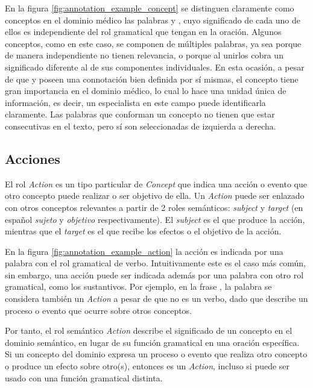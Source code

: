 \vspace{-0.8cm}
En la figura \ref{fig:annotation_example_concept} se distinguen claramente como conceptos en el dominio médico las palabras  y , cuyo significado de cada uno de ellos es independiente del rol gramatical que tengan en la oración. Algunos conceptos, como  en este caso, se componen de múltiples palabras, ya sea porque de manera independiente no tienen relevancia, o porque al unirlos cobra un significado diferente al de sus componentes individuales. En esta ocasión, a pesar de que  y  poseen una connotación bien definida por sí mismas, el concepto  tiene gran importancia en el dominio médico, lo cual lo hace una unidad única de información, es decir, un especialista en este campo puede identificarla claramente. Las palabras que conforman un concepto no tienen que estar consecutivas en el texto, pero sí son seleccionadas de izquierda a derecha.

\subsection{Acciones}
El rol \textit{Action} es un tipo particular de \textit{Concept} que indica una acción o evento que otro concepto puede realizar o ser objetivo de ella. Un \textit{Action} puede ser enlazado con otros conceptos relevantes a partir de 2 roles semánticos: \textit{subject} y \textit{target} (en español \textit{sujeto} y \textit{objetivo} respectivamente). El \textit{subject} es el que produce la acción, mientras que el \textit{target} es el que recibe los efectos o el objetivo de la acción.

En la figura \ref{fig:annotation_example_action} la acción es indicada por una palabra con el rol gramatical de verbo. Intuitivamente este es el caso más común, sin embargo, una acción puede ser indicada además por una palabra con otro rol gramatical, como los sustantivos. Por ejemplo, en la frase , la palabra  se considera también un \textit{Action} a pesar de que no es un verbo, dado que describe un proceso o evento que ocurre sobre otros conceptos.

Por tanto, el rol semántico \textit{Action} describe el significado de un concepto en el dominio semántico, en lugar de su función gramatical en una oración específica. Si un concepto del dominio expresa un proceso o evento que realiza otro concepto o produce un efecto sobre otro(s), entonces es un \textit{Action}, incluso si puede ser usado con una función gramatical distinta.

